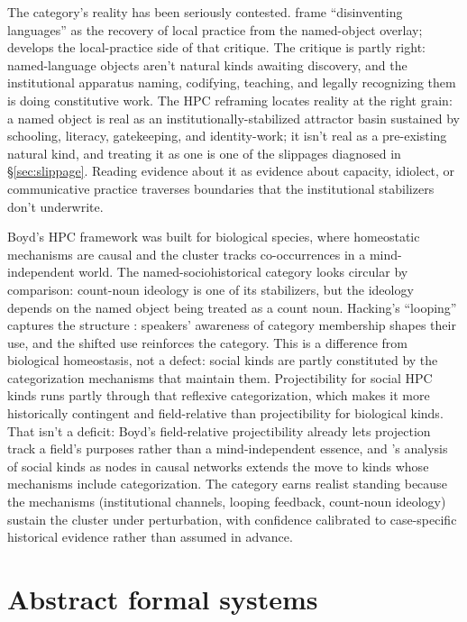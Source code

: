 \documentclass[12pt]{article}
\begin{document}
The category's reality has been seriously contested. \textcite{makoniPennycook2006} frame \enquote{disinventing languages} as the recovery of local practice from the named-object overlay; \textcite{pennycook2010} develops the local-practice side of that critique. The critique is partly right: named-language objects aren't natural kinds awaiting discovery, and the institutional apparatus naming, codifying, teaching, and legally recognizing them is doing constitutive work. The HPC reframing locates reality at the right grain: a named object is real as an institutionally-stabilized attractor basin sustained by schooling, literacy, gatekeeping, and identity-work; it isn't real as a pre-existing natural kind, and treating it as one is one of the slippages diagnosed in §\ref{sec:slippage}. Reading evidence about it as evidence about capacity, idiolect, or communicative practice traverses boundaries that the institutional stabilizers don't underwrite.

Boyd's HPC framework was built for biological species, where homeostatic mechanisms are causal and the cluster tracks co-occurrences in a mind-independent world. The named-sociohistorical category looks circular by comparison: count-noun ideology is one of its stabilizers, but the ideology depends on the named object being treated as a count noun. Hacking's \enquote{looping} captures the structure \citep{hacking1999}: speakers' awareness of category membership shapes their use, and the shifted use reinforces the category. This is a difference from biological homeostasis, not a defect: social kinds are partly constituted by the categorization mechanisms that maintain them. Projectibility for social HPC kinds runs partly through that reflexive categorization, which makes it more historically contingent and field-relative than projectibility for biological kinds. That isn't a deficit: Boyd's field-relative projectibility already lets projection track a field's purposes rather than a mind-independent essence, and \textcite{khalidi2013}'s analysis of social kinds as nodes in causal networks extends the move to kinds whose mechanisms include categorization. The category earns realist standing because the mechanisms (institutional channels, looping feedback, count-noun ideology) sustain the cluster under perturbation, with confidence calibrated to case-specific historical evidence rather than assumed in advance.

\section{Abstract formal systems}\label{sec:formal}
\end{document}
